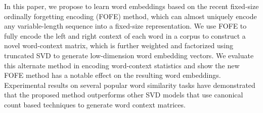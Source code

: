 In this paper, we propose to learn word embeddings based on the recent fixed-size ordinally forgetting encoding (FOFE) method, which can almost uniquely encode any variable-length sequence into a fixed-size representation. We use FOFE to fully encode the left and right context of each word in a corpus to construct a novel word-context matrix, which is further weighted and factorized using truncated SVD to generate low-dimension word embedding vectors. We evaluate this alternate method in encoding word-context statistics and show the new FOFE method has a notable effect on the resulting word embeddings. Experimental results on several popular word similarity tasks have demonstrated that the proposed method  outperforms other SVD models that use canonical count based techniques to generate word context matrices.
